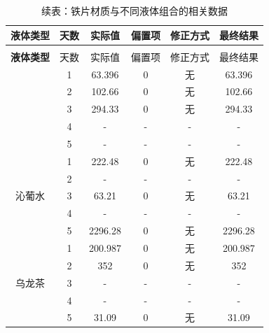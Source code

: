 \documentclass[12pt,a4paper]{ctexart}
\begin{document}
\vspace{1em}

\begin{longtable}{c c c c c c}
  \caption{铁片材质与不同液体组合的相关数据} \\
  \toprule
  \textbf{液体类型} & 天数 & 实际值 & 偏置项 & 修正方式 & 最终结果 \\
  \midrule
  \endfirsthead  %
  
  \caption*{续表：铁片材质与不同液体组合的相关数据} \\
  \toprule
  \textbf{液体类型} & 天数 & 实际值 & 偏置项 & 修正方式 & 最终结果 \\
  \midrule
  \endhead  %
  
  \bottomrule
  \endlastfoot  %

  \multirow{5}{*}{水} 
    & 1 & 63.396   & 0      & 无       & 63.396   \\
    & 2 & 102.66   & 0      & 无       & 102.66   \\
    & 3 & 294.33   & 0      & 无       & 294.33   \\
    & 4 & -       & - & -     & -   \\
    & 5 & -       & - & -     & -  \\
  \midrule
  
  \multirow{5}{*}{沁葡水} 
    & 1 & 222.48   & 0      & 无       & 222.48   \\
    & 2 & -        & -      & -       & -        \\
    & 3 & 63.21    & 0      & 无       & 63.21    \\
    & 4 & -        & -      & -       & -        \\
    & 5 & 2296.28  & 0      & 无       & 2296.28  \\
  \midrule
  
  \multirow{5}{*}{乌龙茶} 
    & 1 & 200.987  & 0      & 无       & 200.987  \\
    & 2 & 352      & 0      & 无       & 352      \\
    & 3 & -        & -      & -       & -        \\
    & 4 & -    & -      & -       & -    \\
    & 5 & 31.09    & 0      & 无       & 31.09    \\

\end{longtable}
\newpage

\end{document}
